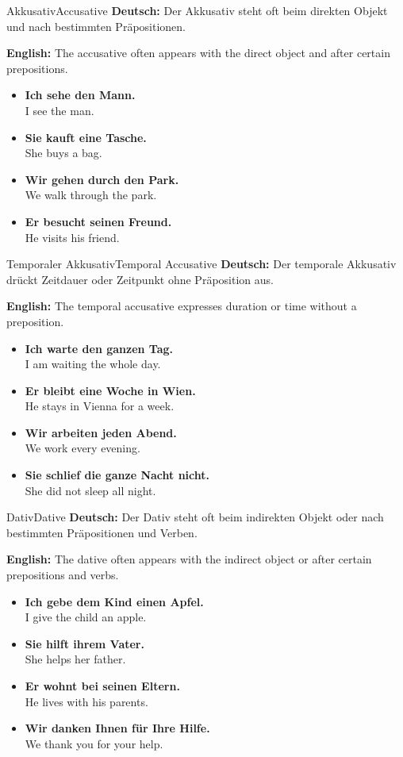 \documentclass[a4paper,11pt]{article}
\newcommand{\GermanText}[1]{\textbf{Deutsch: }#1\par}
\newcommand{\EnglishText}[1]{{\color{SoftGray}\textbf{English: }#1\par}}
\newcommand{\ExampleItem}[2]{\item \textbf{#1}\\{\color{SoftGray}#2}}
\begin{document}
\begin{grammarentry}{Akkusativ}{Accusative}
    \GermanText{Der Akkusativ steht oft beim direkten Objekt und nach bestimmten Präpositionen.}
    \EnglishText{The accusative often appears with the direct object and after certain prepositions.}
    \begin{exbox}
        \begin{itemize}
            \ExampleItem{Ich sehe den Mann.}{I see the man.}
            \ExampleItem{Sie kauft eine Tasche.}{She buys a bag.}
            \ExampleItem{Wir gehen durch den Park.}{We walk through the park.}
            \ExampleItem{Er besucht seinen Freund.}{He visits his friend.}
        \end{itemize}
    \end{exbox}
\end{grammarentry}

\begin{grammarentry}{Temporaler Akkusativ}{Temporal Accusative}
    \GermanText{Der temporale Akkusativ drückt Zeitdauer oder Zeitpunkt ohne Präposition aus.}
    \EnglishText{The temporal accusative expresses duration or time without a preposition.}
    \begin{exbox}
        \begin{itemize}
            \ExampleItem{Ich warte den ganzen Tag.}{I am waiting the whole day.}
            \ExampleItem{Er bleibt eine Woche in Wien.}{He stays in Vienna for a week.}
            \ExampleItem{Wir arbeiten jeden Abend.}{We work every evening.}
            \ExampleItem{Sie schlief die ganze Nacht nicht.}{She did not sleep all night.}
        \end{itemize}
    \end{exbox}
\end{grammarentry}

\begin{grammarentry}{Dativ}{Dative}
    \GermanText{Der Dativ steht oft beim indirekten Objekt oder nach bestimmten Präpositionen und Verben.}
    \EnglishText{The dative often appears with the indirect object or after certain prepositions and verbs.}
    \begin{exbox}
        \begin{itemize}
            \ExampleItem{Ich gebe dem Kind einen Apfel.}{I give the child an apple.}
            \ExampleItem{Sie hilft ihrem Vater.}{She helps her father.}
            \ExampleItem{Er wohnt bei seinen Eltern.}{He lives with his parents.}
            \ExampleItem{Wir danken Ihnen für Ihre Hilfe.}{We thank you for your help.}
        \end{itemize}
    \end{exbox}
\end{grammarentry}
\end{document}
